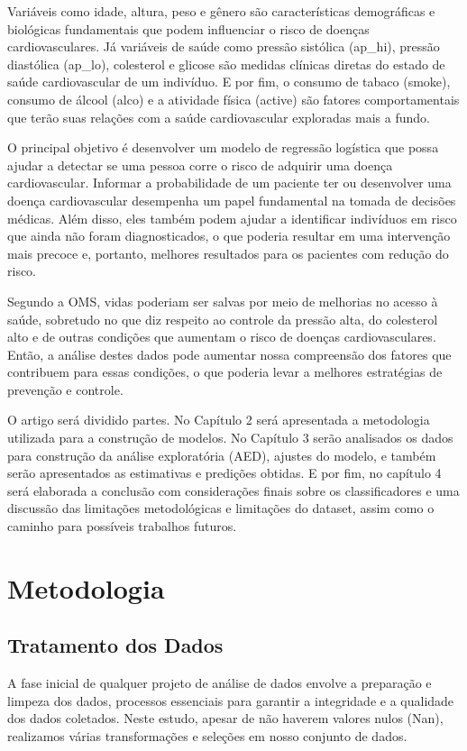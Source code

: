 \documentclass[article,11pt,a4paper,brazil]{abntex2}
\begin{document}
	\newpage
	Variáveis como idade, altura, peso e gênero são características demográficas e biológicas fundamentais que podem influenciar o risco de doenças cardiovasculares. Já variáveis de saúde como pressão sistólica (ap\_hi), pressão diastólica (ap\_lo), colesterol e glicose são medidas clínicas diretas do estado de saúde cardiovascular de um indivíduo. E por fim, o consumo de tabaco (smoke), consumo de álcool (alco) e a atividade física (active) são fatores comportamentais que terão suas relações com a saúde cardiovascular exploradas mais a fundo. 
	
	O principal objetivo é desenvolver um modelo de regressão logística que possa ajudar a detectar se uma pessoa corre o risco de adquirir uma doença cardiovascular. Informar a probabilidade de um paciente ter ou desenvolver uma doença cardiovascular desempenha um papel fundamental na tomada de decisões médicas. Além disso, eles também podem ajudar a identificar indivíduos em risco que ainda não foram diagnosticados, o que poderia resultar em uma intervenção mais precoce e, portanto, melhores resultados para os pacientes com redução do risco. 
	
	Segundo a OMS, vidas poderiam ser salvas por meio de melhorias no acesso à saúde, sobretudo no que diz respeito ao controle da pressão alta, do colesterol alto e de outras condições que aumentam o risco de doenças cardiovasculares. Então, a análise destes dados pode aumentar nossa compreensão dos fatores que contribuem para essas condições, o que poderia levar a melhores estratégias de prevenção e controle.
	
	O artigo será dividido partes. No Capítulo 2 será apresentada a metodologia utilizada para a construção de modelos. No Capítulo 3 serão analisados os dados para construção da análise exploratória (AED), ajustes do modelo, e também serão apresentados as estimativas e predições obtidas. E por fim, no capítulo 4 será elaborada a conclusão com considerações finais sobre os classificadores e uma discussão das limitações metodológicas e limitações do dataset, assim como o caminho para possíveis trabalhos futuros.
	\section{Metodologia}
	\subsection{Tratamento dos Dados}
	A fase inicial de qualquer projeto de análise de dados envolve a preparação e limpeza dos dados, processos essenciais para garantir a integridade e a qualidade dos dados coletados. Neste estudo, apesar de não haverem valores nulos (Nan), realizamos várias transformações e seleções em nosso conjunto de dados.
	
\end{document}
